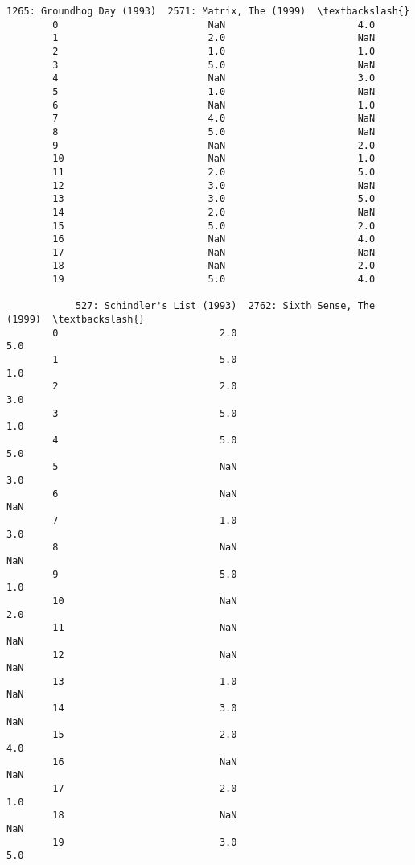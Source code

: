 \documentclass[11pt]{article}
\begin{document}
\begin{Verbatim}[commandchars=\\\{\}]
            1265: Groundhog Day (1993)  2571: Matrix, The (1999)  \textbackslash{}
        0                          NaN                       4.0   
        1                          2.0                       NaN   
        2                          1.0                       1.0   
        3                          5.0                       NaN   
        4                          NaN                       3.0   
        5                          1.0                       NaN   
        6                          NaN                       1.0   
        7                          4.0                       NaN   
        8                          5.0                       NaN   
        9                          NaN                       2.0   
        10                         NaN                       1.0   
        11                         2.0                       5.0   
        12                         3.0                       NaN   
        13                         3.0                       5.0   
        14                         2.0                       NaN   
        15                         5.0                       2.0   
        16                         NaN                       4.0   
        17                         NaN                       NaN   
        18                         NaN                       2.0   
        19                         5.0                       4.0   
        
            527: Schindler's List (1993)  2762: Sixth Sense, The (1999)  \textbackslash{}
        0                            2.0                            5.0   
        1                            5.0                            1.0   
        2                            2.0                            3.0   
        3                            5.0                            1.0   
        4                            5.0                            5.0   
        5                            NaN                            3.0   
        6                            NaN                            NaN   
        7                            1.0                            3.0   
        8                            NaN                            NaN   
        9                            5.0                            1.0   
        10                           NaN                            2.0   
        11                           NaN                            NaN   
        12                           NaN                            NaN   
        13                           1.0                            NaN   
        14                           3.0                            NaN   
        15                           2.0                            4.0   
        16                           NaN                            NaN   
        17                           2.0                            1.0   
        18                           NaN                            NaN   
        19                           3.0                            5.0   
        

\end{Verbatim}
\end{document}
